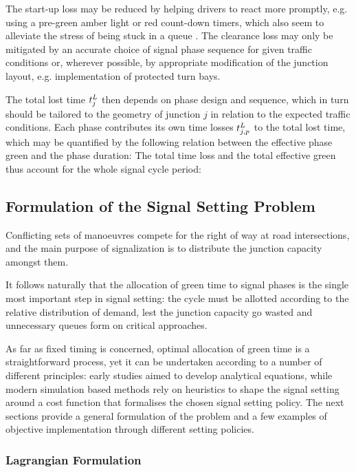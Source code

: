 The start-up loss may be reduced by helping drivers to react more promptly, e.g. using a pre-green amber light or red count-down timers, which also seem to alleviate the stress of being stuck in a queue .
The clearance loss may only be mitigated by an accurate choice of signal phase sequence for given traffic conditions or, wherever possible, by appropriate modification of the junction layout, e.g. implementation of protected turn bays.

The total lost time $t_{j}^L$ then depends on phase design and sequence, which in turn should
be tailored to the geometry of junction $j$ in relation to the expected traffic conditions.
Each phase contributes its own time losses $t_{j,p}^L$ to the total lost time, which may be
quantified by the following relation between the effective phase green and the phase duration:
The total time loss and the total effective green thus account for the whole signal cycle period:


\subsection{Formulation of the Signal Setting Problem}
Conflicting sets of manoeuvres compete for the right of way at road intersections, and the
main purpose of signalization is to distribute the junction capacity amongst them.

It follows naturally that the allocation of green time to signal phases is the single most important step in signal setting: the cycle must be allotted according to the relative distribution of demand,
lest the junction capacity go wasted and unnecessary queues form on critical approaches.

As far as fixed timing is concerned, optimal allocation of green time is a straightforward
process, yet it can be undertaken according to a number of different principles: early studies
aimed to develop analytical equations, while modern simulation based methods rely on
heuristics to shape the signal setting around a cost function that formalises the chosen signal
setting policy. The next sections provide a general formulation of the problem and a few examples of objective implementation through different setting policies.

\subsubsection*{Lagrangian Formulation}

